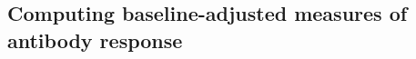 \subsection{Computing baseline-adjusted measures of antibody response}
\label{subsec:hird_dge_TRI}





